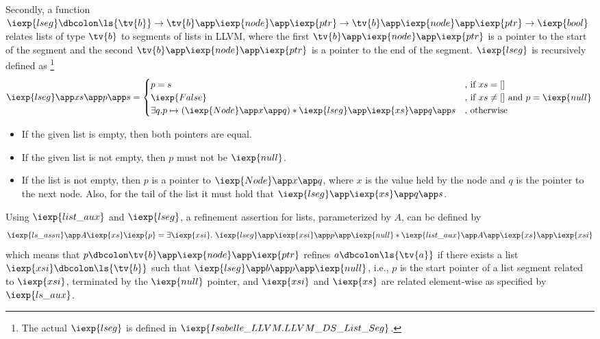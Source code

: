 Secondly, a function $\iexp{lseg} \dbcolon \ls{\tv{b}} \rightarrow \tv{b} \app \iexp{node} \app \iexp{ptr} \rightarrow \tv{b} \app \iexp{node} \app \iexp{ptr} \rightarrow \iexp{bool}$ relates lists of type $\tv{b}$ to segments of lists in LLVM, where the first $\tv{b} \app \iexp{node} \app \iexp{ptr}$ is a pointer to the start of the segment and the second $\tv{b} \app \iexp{node} \app \iexp{ptr}$ is a pointer to the end of the segment.
$\iexp{lseg}$ is recursively defined as
\footnote{The actual $\iexp{lseg}$ is defined in $\iexp{Isabelle\_LLVM.LLVM\_DS\_List\_Seg}$.}
\begin{align*}
  \iexp{lseg} \app xs \app p \app s =
  \begin{cases}
    p = s & \text{, if $xs = []$} \\
    \iexp{False} & \text{, if $xs \neq []$ and $p=\iexp{null}$} \\
    \exists q. p \mapsto (\iexp{Node} \app x \app q) \ast \iexp{lseg} \app \iexp{xs} \app q \app s &\text{, otherwise}
  \end{cases}
\end{align*}
\begin{itemize}
\item If the given list is empty, then both pointers are equal.
\item If the given list is not empty, then $p$ must not be $\iexp{null}$.
\item If the list is not empty, then $p$ is a pointer to $\iexp{Node} \app x \app q$, where $x$ is the value held by the node and $q$ is the pointer to the next node.
      Also, for the tail of the list it must hold that $\iexp{lseg} \app \iexp{xs} \app q \app s$.
\end{itemize}

Using $\iexp{list\_aux}$ and $\iexp{lseg}$, a refinement assertion for lists, parameterized by $A$, can be defined by
\begin{align*}
  \iexp{ls\_assn} \app A \iexp{xs} \iexp{p} = \exists \iexp{xsi}.\ \iexp{lseg} \app \iexp{xsi} \app p \app \iexp{null} \ast \iexp{list\_aux} \app A \app \iexp{xs} \app \iexp{xsi}
\end{align*}
which means that $p \dbcolon \tv{b} \app \iexp{node} \app \iexp{ptr}$ refines $a \dbcolon \ls{\tv{a}}$ if there exists a list $\iexp{xsi} \dbcolon \ls{\tv{b}}$ such that $\iexp{lseg} \app b \app p \app \iexp{null}$, i.e., $p$ is the start pointer of a list segment related to $\iexp{xsi}$, terminated by the $\iexp{null}$ pointer, and $\iexp{xsi}$ and $\iexp{xs}$ are related element-wise as specified by $\iexp{ls\_aux}$.

